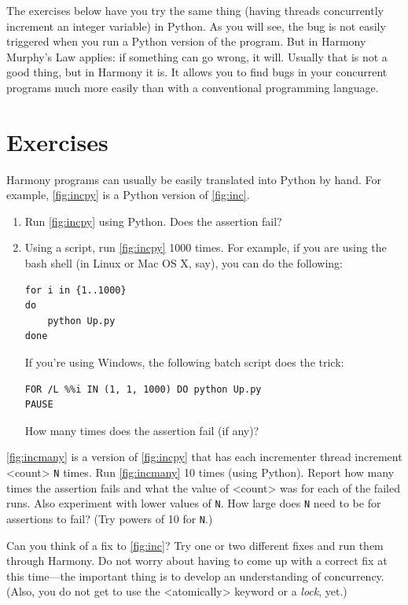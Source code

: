 \documentclass{report}
\newenvironment{code}{
\tcolorbox
}{
\endtcolorbox
}
\begin{document}
The exercises below have you try the same thing (having threads
concurrently increment an integer variable) in Python.  As you will
see, the bug is not easily triggered when you run a Python version of
the program.  But in Harmony Murphy's Law applies:
if something can go wrong, it will.  Usually that is not a good thing,
but in Harmony it is.  It allows you to find bugs in your concurrent
programs much more easily than with a conventional programming language.

\section*{Exercises}


\begin{problems}
\item Harmony programs can usually be easily translated into
Python by hand.  For example,
\autoref{fig:incpy} is a Python version of \autoref{fig:inc}.
\begin{enumerate}
\item Run \autoref{fig:incpy} using Python.  Does the assertion fail?
\item Using a script, run \autoref{fig:incpy} 1000 times.
For example, if you are using the bash shell (in Linux or Mac OS X, say), you can do the following:
\begin{code}
\begin{verbatim}
for i in {1..1000}
do
    python Up.py
done
\end{verbatim}
\end{code}
If you're using Windows, the following batch script does the trick:
\begin{code}
\begin{verbatim}
FOR /L %%i IN (1, 1, 1000) DO python Up.py
PAUSE
\end{verbatim}
\end{code}
How many times does the assertion fail (if any)?
\end{enumerate}
\item \autoref{fig:incmany} is a version of \autoref{fig:incpy} that has each
incrementer thread increment <{count}> \texttt{N} times.  Run \autoref{fig:incmany}
10 times (using Python).
Report how many times the assertion fails and what the value of <{count}>
was for each of the failed runs.
Also experiment with lower values of \texttt{N}.
How large does \texttt{N} need to be for assertions to fail?
(Try powers of 10 for \texttt{N}.)
\item Can you think of a fix to \autoref{fig:inc}?  Try one or two different fixes
and run them through Harmony.  Do not worry about having to come up with a correct fix at this
time---the important thing is to develop an understanding of concurrency.
(Also, you do not get to use the <{atomically}> keyword
or a \emph{lock}, yet.)
\end{problems}
\end{document}
